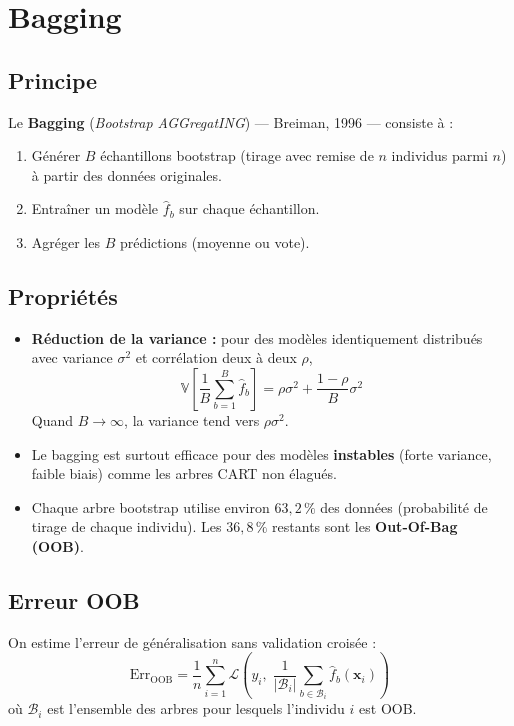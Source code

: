 \documentclass[a4paper,11pt]{article}
\begin{document}
\section{Bagging}

\subsection{Principe}

Le \textbf{Bagging} (\textit{Bootstrap AGGregatING}) — Breiman, 1996 — consiste à :
\begin{enumerate}
    \item Générer $B$ échantillons bootstrap (tirage avec remise de $n$ individus parmi $n$) à partir des données originales.
    \item Entraîner un modèle $\hat{f}_b$ sur chaque échantillon.
    \item Agréger les $B$ prédictions (moyenne ou vote).
\end{enumerate}

\subsection{Propriétés}

\begin{itemize}
    \item \textbf{Réduction de la variance :} pour des modèles identiquement distribués avec variance $\sigma^2$ et corrélation deux à deux $\rho$,
    \[
    \mathbb{V}\!\left[\frac{1}{B}\sum_{b=1}^B \hat{f}_b\right] = \rho\sigma^2 + \frac{1-\rho}{B}\sigma^2
    \]
    Quand $B \to \infty$, la variance tend vers $\rho\sigma^2$.
    \item Le bagging est surtout efficace pour des modèles \textbf{instables} (forte variance, faible biais) comme les arbres CART non élagués.
    \item Chaque arbre bootstrap utilise environ $63{,}2\,\%$ des données (probabilité de tirage de chaque individu). Les $36{,}8\,\%$ restants sont les \textbf{Out-Of-Bag (OOB)}.
\end{itemize}

\subsection{Erreur OOB}

On estime l'erreur de généralisation sans validation croisée :
\[
\text{Err}_{\text{OOB}} = \frac{1}{n}\sum_{i=1}^n \mathcal{L}\!\left(y_i,\; \frac{1}{|\mathcal{B}_i|}\sum_{b \in \mathcal{B}_i} \hat{f}_b(\mathbf{x}_i)\right)
\]
où $\mathcal{B}_i$ est l'ensemble des arbres pour lesquels l'individu $i$ est OOB.
\end{document}
